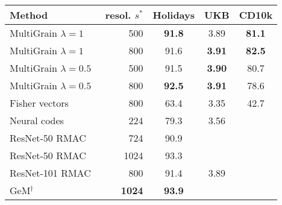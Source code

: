 %


%
%
%
%
%
%
%
%
%
%
%
%
%
%
%
%
%
%
%
%
%
%
%
%
%
%
%
%

\def \mysp {\hspace{3pt}}
{\small
%
\begin{tabular}{@{\hspace{5pt}}l@{\hspace{5pt}}r ccc@{\hspace{5pt}}}
\toprule
Method & resol. $s^*$ & Holidays & UKB & CD10k \\ 
%
\midrule
MultiGrain $\lambda=1$                     & 500  & {\bf 91.8} & 3.89       & {\bf 81.1} \\
MultiGrain $\lambda=1$                     & 800  & 91.6       & {\bf 3.91} & {\bf 82.5} \\
MultiGrain $\lambda=0.5$                   & 500  & 91.5       & {\bf 3.90} & 80.7 \\
MultiGrain $\lambda=0.5$                   & 800  & {\bf 92.5} & {\bf 3.91} & 78.6 \\
\hline 
%
Fisher vectors~\cite{jegou2012aggregating} & 800  & 63.4       & 3.35       & 42.7 \\
Neural codes~\cite{babenko2014neural}      & 224  & 79.3       & 3.56 \\
ResNet-50 RMAC~\cite{Gordo2016DeepIR}      & 724  & 90.9  \\
ResNet-50 RMAC~\cite{Gordo2016DeepIR}      & 1024 & 93.3 \\
ResNet-101 RMAC~\cite{Gordo2017EndtoEndLO} & 800  & 91.4 & 3.89\\
GeM$^\dagger$~\cite{radenovic2018fine}     & {\bf 1024} &  {\bf 93.9} \\
\bottomrule
\end{tabular}
}